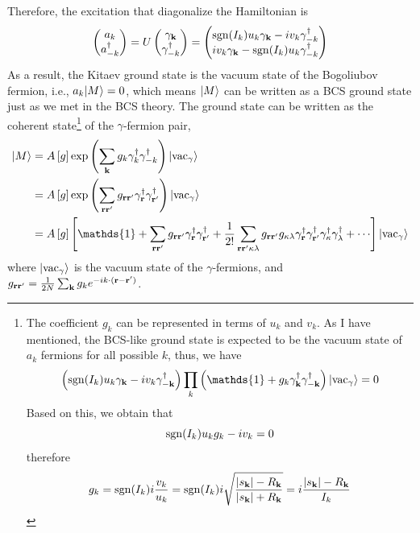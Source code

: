 Therefore, the excitation that diagonalize the Hamiltonian is 
\begin{equation}\label{Bogo.e}
\begin{pmatrix}
    a_k \\
    a_{-k}^\dagger 
  \end{pmatrix} 
  = 
  U
    \begin{pmatrix}
     \gamma_{\mathbf{k}} \\
     \gamma^\dagger_{-k} 
    \end{pmatrix} 
    = 
    \begin{pmatrix}
        \mathrm{sgn}(I_k) u_k\gamma_{\mathbf{k}} - iv_k\gamma^\dagger_{-k} \\
         i v_k\gamma_{\mathbf{k}} - \mathrm{sgn}(I_k) u_k\gamma^\dagger_{-k} 
   \end{pmatrix}
\end{equation}
As a result, the Kitaev ground state is the vacuum state of the Bogoliubov fermion, i.e., $a_{k}| M \rangle = 0$, which means $| M \rangle$ can be written as a BCS ground state just as we met in the BCS theory. The ground state can be written as the coherent state\footnote{
The coefficient $g_k$ can be represented in terms of $u_k$ and $v_k$. As I have mentioned, the BCS-like ground state is expected to be the vacuum state of $a_k$ fermions for all possible $k$, thus, we have
\[
\lr{\mrm{sgn}(I_k) u_k\gamma_{\bo{k}} - iv_k\gamma_{-\bo{k}}^\dagger}\prod_{k}\lr{\mathds{1} + g_k\gamma_{\bo{k}}^\dagger \gamma_{-\bo{k}}^\dagger}\ket{\vac_\gamma} = 0
\]
Based on this, we obtain that 
\[\mathrm{sgn}(I_k) u_kg_k - iv_k = 0\]
therefore
\begin{equation}\label{g_k solution.e}
  g_k = \mathrm{sgn}(I_k)i\frac{v_k}{u_k} = \mathrm{sgn}(I_k) i\sqrt{\frac{\left| s_{\mathbf{k}} \right| - R_{\mathbf{k}}}{\left| s_{\mathbf{k}} \right| + R_{\mathbf{k}}}} = i\frac{\left| s_{\mathbf{k}} \right| - R_{\mathbf{k}}}{I_k}
\end{equation}
} of the $\gamma$-fermion pair,
\begin{align*}
  \ket{M} &= A\lrm{g}\exp\lr{\sum_{\bo{k}}g_k \gamma^\dagger_k \gamma^\dagger_{-k}}\ket{\vac_\gamma}\\
   &= A\lrm{g}\exp\lr{\sum_{{\bo{r}}{\bo{r}'}}g_{{\bo{r}}{\bo{r}'}} \gamma^\dagger_{\bo{r}} \gamma^\dagger_{{\bo{r}'}}}\ket{\vac_\gamma}\\
   &= A\lrm{g}\lrm{\mathds{1} + \sum_{{\bo{r}}{\bo{r}'}}g_{{\bo{r}}{\bo{r}'}} \gamma^\dagger_{\bo{r}} \gamma^\dagger_{{\bo{r}'}} + \frac{1}{2!}\sum_{{\bo{r}}{\bo{r}'}\kappa\lambda}g_{{\bo{r}}{\bo{r}'}}g_{\kappa\lambda
   } \gamma^\dagger_{\bo{r}} \gamma^\dagger_{{\bo{r}'}}\gamma^\dagger_\kappa \gamma^\dagger_{\lambda} + \cdots}\ket{\vac_\gamma}
\end{align*}
where $| \mathrm{vac}_\gamma \rangle$ is the vacuum state of the $\gamma$-fermions, and $g_{{\mathbf{r}}{\mathbf{r}'}} = \frac{1}{2N}\sum_{\mathbf{k}}g_ke^{-ik\cdot(\mathbf{r}-\mathbf{r}')}$. 

